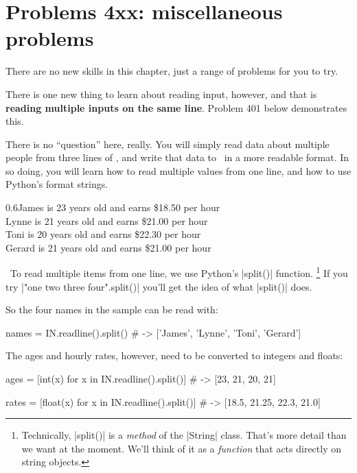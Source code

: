 

\chapter{Problems 4xx: miscellaneous problems}

There are no new skills in this chapter, just a range of problems for you to try.

There is one new thing to learn about reading input, however, and that is \textbf{reading
multiple inputs on the same line}. Problem 401 below demonstrates this.




There is no ``question'' here, really. You will simply read data about multiple people
from three lines of \IN, and write that data to \OUT\ in a more readable format. In so
doing, you will learn how to read multiple values from one line, and how to use Python's
format strings.

\Sample

       {0.6}{James is 23 years old and earns \$18.50 per hour\\
             Lynne is 21 years old and earns \$21.00 per hour\\
             Toni is 20 years old and earns \$22.30 per hour\\
             Gerard is 21 years old and earns \$21.00 per hour}

\Scratch\ To read multiple items from one line, we use Python's \pycode|split()| function.%
\footnote{Technically, \pycode|split()| is a \emph{method} of the \pycode|String| class.
That's more detail than we want at the moment. We'll think of it as a \emph{function} that
acts directly on string objects.}
If you try \pycode|"one two three four".split()| you'll get the idea of what
\pycode|split()| does.

So the four names in the sample can be read with:
\begin{pythoncode}
  names = IN.readline().split()
             # -> ['James', 'Lynne', 'Toni', 'Gerard']
\end{pythoncode}

The ages and hourly rates, however, need to be converted to integers and floats:
\begin{pythoncode}
  ages  = [int(x) for x in IN.readline().split()]
             # -> [23, 21, 20, 21]

  rates = [float(x) for x in IN.readline().split()]
             # -> [18.5, 21.25, 22.3, 21.0]
\end{pythoncode}

